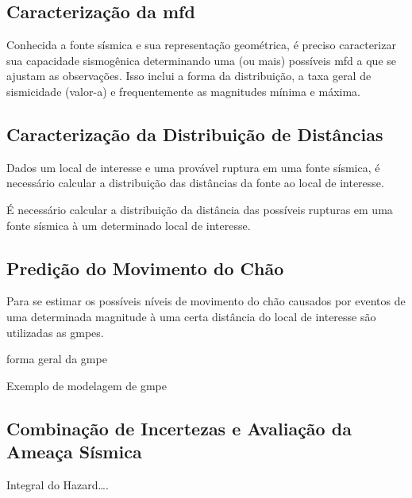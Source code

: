 \subsection{Caracterização da \gls{mfd}}
\label{sec:psha_mfd}

Conhecida a fonte sísmica e sua representação geométrica, é preciso caracterizar sua capacidade sismogênica determinando
uma (ou mais) possíveis \gls{mfd} a que se ajustam as observações. Isso inclui a forma da distribuição, a taxa geral de
sismicidade (valor-a) e frequentemente as magnitudes mínima e máxima. 

\subsection{Caracterização da Distribuição de Distâncias}
\label{sec:psha_distances}

Dados um local de interesse e uma provável ruptura em uma fonte sísmica, é necessário calcular a distribuição das
distâncias da fonte ao local de interesse.

É necessário calcular a distribuição da distância das possíveis rupturas em uma fonte sísmica à um determinado local de
interesse.


\subsection{Predição do Movimento do Chão}
\label{sec:gmpe}

Para se estimar os possíveis níveis de movimento do chão causados por eventos de uma determinada magnitude à uma certa
distância do local de interesse são utilizadas as \glspl{gmpe}.

forma geral da gmpe

Exemplo de modelagem de gmpe


\subsection{Combinação de Incertezas e Avaliação da Ameaça Sísmica}
\label{sec:hazard}


Integral do Hazard\ldots.

